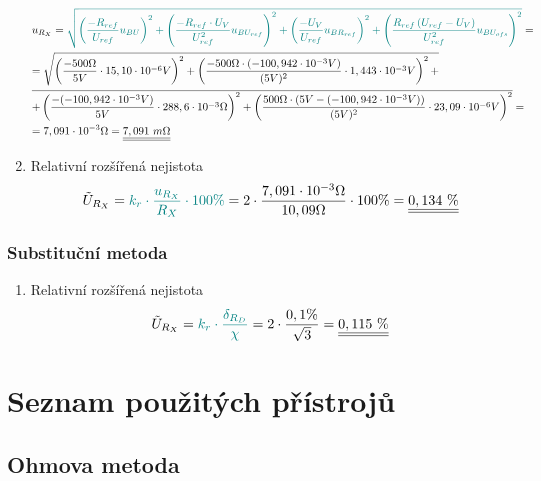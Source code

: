 \documentclass[a4paper, czech]{article}
\begin{document}
\begin{enumerate}
    \begin{multline*}
        u_{R_X} = \textcolor{teal}{\sqrt{\left(\frac{-R_{ref}}{U_{ref}} u_{BU}\right)^2 + \left(\frac{-R_{ref} \cdot U_V}{U_{ref}^2} u_{BU_{ref}}\right)^2 + \left(\frac{-U_V}{U_{ref}} u_{BR_{ref}}\right)^2 + \left(\frac{R_{ref} \left(U_{ref} - U_V\right)}{U_{ref}^2} u_{BU_{ofs}}\right)^2}} = \hfill \\
        = \sqrt{\left(\frac{-500 \Omega}{5V} \cdot 15,10 \cdot 10^{-6} V\right)^2 + \left(\frac{-500 \Omega \cdot (- 100,942 \cdot 10^{-3}V)}{(5V)^2} \cdot 1,443 \cdot 10^{-3}V\right)^2 + } \hfill \\
        \overline{+ \left(\frac{-(- 100,942 \cdot 10^{-3}V)}{5V} \cdot 288,6 \cdot 10^{-3} \Omega\right)^2 + \left(\frac{500 \Omega \cdot \left(5V - (- 100,942 \cdot 10^{-3}V)\right)}{(5V)^2} \cdot 23,09 \cdot 10^{-6} V\right)^2} = \hfill \\
        = 7,091 \cdot 10^{-3} \Omega = \underline{\underline{7,091\ m\Omega}} \hfill
    \end{multline*}
    \item Relativní rozšířená nejistota
    \begin{multline*}
        \tilde{U}_{R_X} = \textcolor{teal}{k_r \cdot \frac{u_{R_X}}{R_X} \cdot 100 \%} = 2 \cdot \frac{7,091 \cdot 10^{-3} \Omega}{10,09 \Omega} \cdot 100 \% = \underline{\underline{0,134\ \%}} \hfill
    \end{multline*}
\end{enumerate}

\subsubsection{Substituční metoda}

\begin{enumerate}
    \item Relativní rozšířená nejistota
    \begin{multline*}
        \tilde{U}_{R_X} = \textcolor{teal}{k_r \cdot \frac{\delta_{R_D}}{\chi}} = 2 \cdot \frac{0,1\%}{\sqrt{3}} = \underline{\underline{0,115\ \%}} \hfill
    \end{multline*}
\end{enumerate}

\section{Seznam použitých přístrojů}

\subsection{Ohmova metoda}
\end{document}

